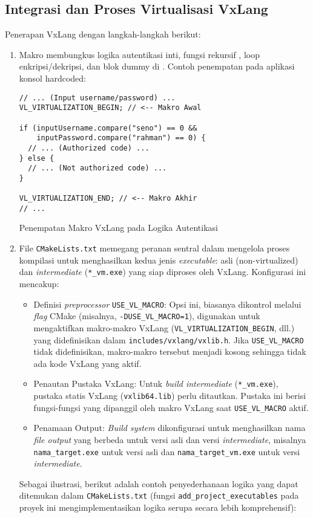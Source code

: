\subsection{Integrasi dan Proses Virtualisasi VxLang}
Penerapan VxLang  dengan langkah-langkah berikut:

\begin{enumerate}
	\item {} Makro   membungkus logika autentikasi inti, fungsi rekursif , loop enkripsi/dekripsi, dan blok dummy di . Contoh penempatan pada aplikasi konsol hardcoded:
	      \begin{listing}[H]
		      \begin{verbatim}
// ... (Input username/password) ...
VL_VIRTUALIZATION_BEGIN; // <-- Makro Awal

if (inputUsername.compare("seno") == 0 &&
    inputPassword.compare("rahman") == 0) {
  // ... (Authorized code) ...
} else {
  // ... (Not authorized code) ...
}

VL_VIRTUALIZATION_END; // <-- Makro Akhir
// ...
            \end{verbatim}
		      \caption{Penempatan Makro VxLang pada Logika Autentikasi}
          \end{listing}
\item {} File \texttt{CMakeLists.txt} memegang peranan sentral dalam mengelola proses kompilasi untuk menghasilkan kedua jenis \textit{executable}: asli (non-virtualized) dan \textit{intermediate} (\texttt{*\_vm.exe}) yang siap diproses oleh VxLang. Konfigurasi ini mencakup:
      \begin{itemize}
        \item Definisi \textit{preprocessor} \texttt{USE\_VL\_MACRO}: Opsi ini, biasanya dikontrol melalui \textit{flag} CMake (misalnya, \texttt{-DUSE\_VL\_MACRO=1}), digunakan untuk mengaktifkan makro-makro VxLang (\texttt{VL\_VIRTUALIZATION\_BEGIN}, dll.) yang didefinisikan dalam \texttt{includes/vxlang/vxlib.h}. Jika \texttt{USE\_VL\_MACRO} tidak didefinisikan, makro-makro tersebut menjadi kosong sehingga tidak ada kode VxLang yang aktif.
        \item Penautan Pustaka VxLang: Untuk \textit{build intermediate} (\texttt{*\_vm.exe}), pustaka statis VxLang (\texttt{vxlib64.lib}) perlu ditautkan. Pustaka ini berisi fungsi-fungsi yang dipanggil oleh makro VxLang saat \texttt{USE\_VL\_MACRO} aktif.
        \item Penamaan Output: \textit{Build system} dikonfigurasi untuk menghasilkan nama \textit{file output} yang berbeda untuk versi asli dan versi \textit{intermediate}, misalnya \texttt{nama\_target.exe} untuk versi asli dan \texttt{nama\_target\_vm.exe} untuk versi \textit{intermediate}.
      \end{itemize}
Sebagai ilustrasi, berikut adalah contoh penyederhanaan logika yang dapat ditemukan dalam \texttt{CMakeLists.txt} (fungsi \texttt{add\_project\_executables} pada proyek ini mengimplementasikan logika serupa secara lebih komprehensif):


\end{enumerate}
